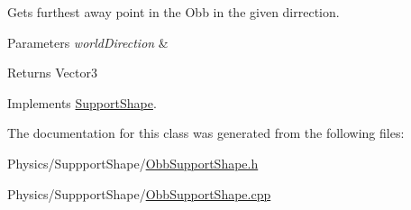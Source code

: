 Gets furthest away point in the Obb in the given dirrection. 


\begin{DoxyParams}{Parameters}
{\em world\+Direction} & \\
\hline
\end{DoxyParams}
\begin{DoxyReturn}{Returns}
Vector3 
\end{DoxyReturn}


Implements \hyperlink{classSupportShape_ad6aca93d79a36c7db3a449a4364a2c1e}{Support\+Shape}.



The documentation for this class was generated from the following files\+:\begin{DoxyCompactItemize}
\item 
Physics/\+Suppport\+Shape/\hyperlink{ObbSupportShape_8h}{Obb\+Support\+Shape.\+h}\item 
Physics/\+Suppport\+Shape/\hyperlink{ObbSupportShape_8cpp}{Obb\+Support\+Shape.\+cpp}\end{DoxyCompactItemize}
